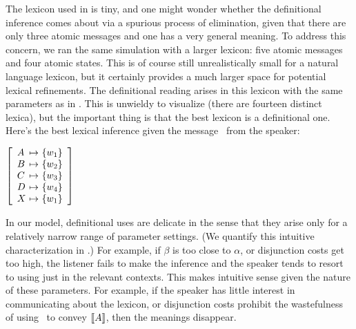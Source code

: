 \documentclass[12pt,twoside]{article}
\renewcommand{\_}{\textbf{\textunderscore\hspace{-4pt}\textunderscore\hspace{-3pt}\textunderscore\hspace{-4pt}\textunderscore}\hspace{0.5pt}}			%
\begin{document}
The lexicon used in  is tiny, and one might wonder
whether the definitional inference comes about via a spurious process
of elimination, given that there are only three atomic messages and
one has a very general meaning. To address this concern, we ran the
same simulation with a larger lexicon: five atomic messages and four
atomic states. This is of course still unrealistically small for a
natural language lexicon, but it certainly provides a much larger
space for potential lexical refinements. The definitional reading
arises in this lexicon with the same parameters as in
. This is unwieldy to visualize (there are fourteen
distinct lexica), but the important thing is that the best lexicon is
a definitional one. Here's the best lexical inference given the
message \AorX\ from the speaker:
%
\begin{exe}
\ex\label{def-lex-large}
  $\left[
    \begin{array}[c]{l@{ \ \mapsto \ }l}
      A & \set{w_{1}} \\
      B & \set{w_{2}} \\
      C & \set{w_{3}} \\
      D & \set{w_{4}} \\
      X & \set{w_{1}}
    \end{array}
  \right]$
\end{exe}

In our model, definitional uses are delicate in the sense that they
arise only for a relatively narrow range of parameter settings. (We
quantify this intuitive characterization in
.) For example, if $\beta$ is too close
to $\alpha$, or disjunction costs get too high, the listener fails to
make the inference and the speaker tends to resort to using just
 in the relevant contexts. This makes intuitive sense given
the nature of these parameters. For example, if the speaker has little
interest in communicating about the lexicon, or disjunction costs
prohibit the wastefulness of using \AorX\ to convey
$\llbracket A\rrbracket$, then the meanings disappear.
\end{document}
